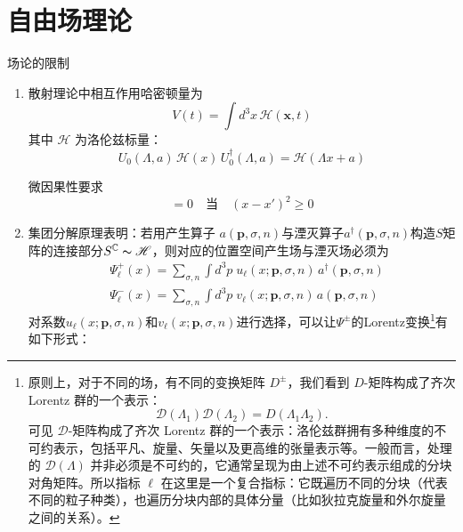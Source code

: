 \section{自由场理论}
场论的限制\begin{enumerate}
    \item 散射理论中相互作用哈密顿量为
        \begin{equation}
        V(t)=\int d^3x\,\mathscr{H}(\mathbf{x},t)
        \end{equation}
        其中 $\mathscr{H}$ 为洛伦兹标量：
            \begin{equation}
                    U_0(\Lambda,a)\,\mathscr{H}(x)\,U_0^\dagger(\Lambda,a)
                    =\mathscr{H}(\Lambda x + a)
            \end{equation}

        微因果性要求
            \begin{equation}
                [\mathscr{H}(\mathbf{x},t),\mathscr{H}(\mathbf{x}',t)]=0
                \quad\text{当}\quad(x-x')^2 \ge 0
            \end{equation}
    \item 集团分解原理表明：若用产生算子 $a(\boldsymbol{p},\sigma,n)$与湮灭算子$a^\dagger(\boldsymbol{p},\sigma,n)$构造$S$矩阵的连接部分$S^\mathbb{C}\thicksim \mathscr{H}$，则对应的位置空间产生场与湮灭场必须为
            \begin{subequations}
                   \begin{align}
                     &\Psi^{+}_\ell(x)=\sum_{\sigma,n}\int d^3p\;u_\ell(x;\boldsymbol{p},\sigma,n)\,a^\dagger(\boldsymbol{p},\sigma,n)\\
                    &\Psi^{-}_\ell(x)=\sum_{\sigma,n}\int d^3p\;v_\ell(x;\boldsymbol{p},\sigma,n)\,a(\boldsymbol{p},\sigma,n)
                   \end{align}
            \end{subequations}
            对系数$u_\ell(x;\boldsymbol{p},\sigma,n)$和$v_\ell(x;\boldsymbol{p},\sigma,n)$进行选择，可以让$\Psi^\pm$的Lorentz变换\footnote{原则上，对于不同的场，有不同的变换矩阵 $D^{\pm}$，我们看到 $D$-矩阵构成了齐次 Lorentz 群的一个表示：
$$ \mathscr{D}(\Lambda_1)\mathscr{D}(\Lambda_2) = D(\Lambda_1\Lambda_2) .  $$
可见 $\mathscr{D}$-矩阵构成了齐次 Lorentz 群的一个表示：洛伦兹群拥有多种维度的不可约表示，包括平凡、旋量、矢量以及更高维的张量表示等。一般而言，处理的 $\mathscr{D}(\Lambda)$ 并非必须是不可约的，它通常呈现为由上述不可约表示组成的分块对角矩阵。所以指标 $\ell$ 在这里是一个复合指标：它既遍历不同的分块（代表不同的粒子种类），也遍历分块内部的具体分量（比如狄拉克旋量和外尔旋量之间的关系）。}有如下形式：

\end{enumerate}
